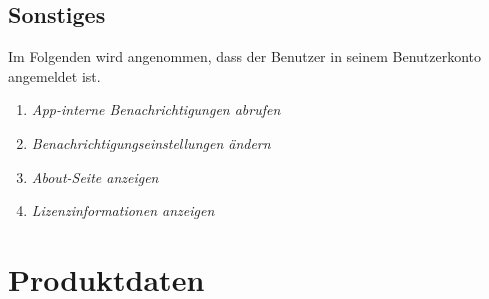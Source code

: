 \documentclass[parskip=full]{scrartcl}
\def\threedigits#1{%
  \ifnum#1<100 0\fi
  \ifnum#1<10 0\fi
  \number#1}
\begin{document}
\subsection{Sonstiges}
Im Folgenden wird angenommen, dass der Benutzer in seinem Benutzerkonto angemeldet ist.

\begin{enumerate}[label={\textbf{/F\protect\threedigits{\theenumi}0/}}, leftmargin=*, resume]	
	\item \textit{App-interne Benachrichtigungen abrufen}
	\item \textit{Benachrichtigungseinstellungen ändern}
	\item \textit{About-Seite anzeigen}
	\item \textit{Lizenzinformationen anzeigen}
\end{enumerate}

\newpage
\section{Produktdaten}
\end{document}
